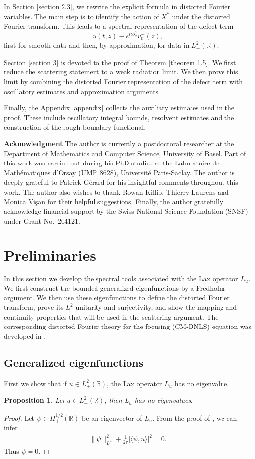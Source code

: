 \documentclass[10pt]{article}
\newtheorem{proposition}[theorem]{Proposition}
\numberwithin{equation}{section}
\numberwithin{theorem}{section}
\providecommand{\thank}[1]
{
  \small	
  \textbf{Acknowledgment } #1
}
\begin{document}
In Section \ref{section 2.3}, we rewrite the explicit formula in distorted Fourier variables. The main
step is to identify the action of \(X^*\) under the distorted Fourier transform. This
leads to a spectral representation of the defect term
\[
u(t,z)-e^{it\partial_x^2}v_0^-(z),
\]
first for smooth data and then, by approximation, for data in
\(L_{+}^{2}(\mathbb R)\).

Section \ref{section 3} is devoted to the proof of Theorem \ref{theorem 1.5}. We first reduce the
scattering statement to a weak radiation limit. We then prove this limit by
combining the distorted Fourier representation of the defect term with oscillatory estimates and approximation arguments.

Finally, the Appendix \ref{appendix} collects the auxiliary estimates used in the proof. These include
oscillatory integral bounds, resolvent estimates and the
construction of the rough boundary functional.
\vskip 0.5cm
\thank{The author is currently a postdoctoral researcher at the Department of Mathematics and Computer Science, University of Basel. Part of this work was carried out during his PhD studies at the Laboratoire de Mathématiques d’Orsay (UMR 8628), Université Paris-Saclay. The author is deeply grateful to Patrick Gérard for his insightful comments throughout this work. The author also wishes to thank Rowan Killip, Thierry Laurens and Monica Vi\c{s}an for their helpful suggestions. Finally, the author gratefully acknowledge financial support by the Swiss National Science Foundation (SNSF) under Grant No.~204121.}
\section{Preliminaries}
\label{Section 2}
In this section we develop the spectral tools associated with the Lax operator \(L_u\).
We first construct the bounded generalized eigenfunctions by a Fredholm argument. We then use these eigenfunctions to define the distorted Fourier
transform, prove its \(L^2\)-unitarity and surjectivity, and show the mapping and
continuity properties that will be used in the scattering argument. The corresponding
distorted Fourier theory for the focusing (CM-DNLS) equation was developed in
\cite[Section 4]{78}.

\subsection{Generalized eigenfunctions}\label{sec 2.1}
First we show that if $u \in L_{+}^2(\mathbb{R})$, the Lax operator $L_u$ has no eigenvalue.
\begin{proposition}
\label{prop:no_eigenvalues_L2_defocusing}
Let $u \in L_{+}^2(\mathbb{R})$, then $L_u$ has no eigenvalues.
\end{proposition}
\begin{proof}
Let $\psi \in H_{+}^{1/2}(\mathbb{R})$ be an eigenvector of $L_u$. From the proof of \cite[Proposition 5.1]{5}, we can infer
\begin{align*}
\|\psi\|_{L^2}^2+\frac{1}{2 \pi}|\langle\psi, u\rangle|^2 = 0.
\end{align*}
Thus $\psi = 0$. 
\end{proof}
\end{document}
